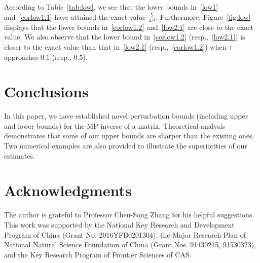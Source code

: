 \documentclass[11pt]{article}
\begin{document}
According to Table~\ref{tab:low}, we see that the lower bounds in~\eqref{low1} and~\eqref{corlow1.1} have attained the exact value $\frac{5}{4\tau^{2}}$. Furthermore, Figure~\ref{fig:low} displays that the lower bounds in~\eqref{corlow1.2} and~\eqref{low2.1} are close to the exact value. We also observe that the lower bound in~\eqref{corlow1.2} (resp.,~\eqref{low2.1}) is closer to the exact value than that in~\eqref{low2.1} (resp.,~\eqref{corlow1.2}) when $\tau$ approaches $0.1$ (resp., $0.5$).

\section{Conclusions}

\label{sec:con}

In this paper, we have established novel perturbation bounds (including upper and lower bounds) for the MP inverse of a matrix. Theoretical analysis demonstrates that some of our upper bounds are sharper than the existing ones. Two numerical examples are also provided to illustrate the superiorities of our estimates.

\section*{Acknowledgments}

The author is grateful to Professor Chen-Song Zhang for his helpful suggestions. This work was supported by the National Key Research and Development Program of China (Grant No. 2016YFB0201304), the Major Research Plan of National Natural Science Foundation of China (Grant Nos. 91430215, 91530323), and the Key Research Program of Frontier Sciences of CAS.



\end{document}
